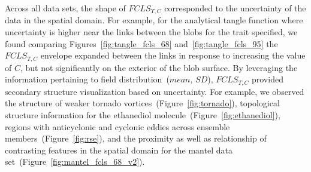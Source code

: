 %
%
Across all data sets, the shape of $FCLS_{T,C}$ corresponded to the uncertainty of the data in the spatial domain.
%
For example, for the analytical tangle function where uncertainty is higher near the links between the blobs for the trait specified, we found comparing Figures~\ref{fig:tangle_fcls_68} and~\ref{fig:tangle_fcls_95} the $FCLS_{T,C}$ envelope expanded between the links in response to increasing the value of $C$, but not significantly on the exterior of the blob surface.
%
By leveraging the information pertaining to field distribution~($mean$, $SD$), $FCLS_{T,C}$ provided secondary structure visualization based on uncertainty.
%
%
For example, we observed the structure of weaker tornado vortices~(Figure~\ref{fig:tornado}), topological structure information for the ethanediol molecule~(Figure~\ref{fig:ethanediol}), regions with anticyclonic and cyclonic eddies across ensemble members~(Figure~\ref{fig:rse}), and the proximity as well as relationship of contrasting features in the spatial domain for the mantel data set~(Figure~\ref{fig:mantel_fcls_68_v2}).
%
%
%
 
